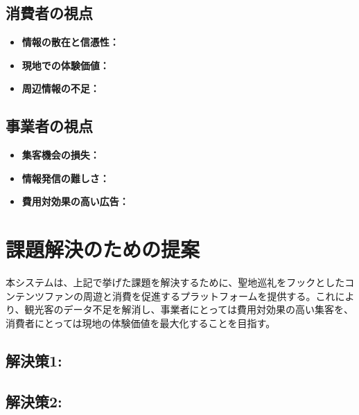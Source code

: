 \documentclass{docs}
\begin{document}
\subsection{消費者の視点}
\begin{itemize}
	\item \textbf{情報の散在と信憑性：}
	\item \textbf{現地での体験価値：}
	\item \textbf{周辺情報の不足：}
\end{itemize}


\subsection{事業者の視点}
\begin{itemize}
	\item \textbf{集客機会の損失：}
	\item \textbf{情報発信の難しさ：}
	\item \textbf{費用対効果の高い広告：}
\end{itemize}

\section{課題解決のための提案}

本システムは、上記で挙げた課題を解決するために、聖地巡礼をフックとしたコンテンツファンの周遊と消費を促進するプラットフォームを提供する。これにより、観光客のデータ不足を解消し、事業者にとっては費用対効果の高い集客を、消費者にとっては現地の体験価値を最大化することを目指す。



\subsection{解決策1: }

\subsection{解決策2: }
\end{document}
